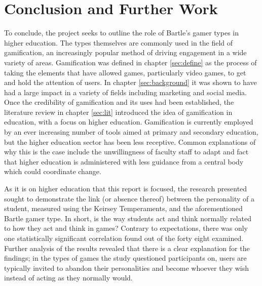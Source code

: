 \documentclass[12pt,a4paper,twoside]{report}
\begin{document}
\chapter{Conclusion and Further Work}
\label{sec:conclusion}
To conclude, the project seeks to outline the role of Bartle's gamer types in higher education. The types themselves are commonly used in the field of gamification, an increasingly popular method of driving engagement in a wide variety of areas. Gamification was defined in chapter \ref{sec:define} as the process of taking the elements that have allowed games, particularly video games, to get and hold the attention of users. In chapter \ref{sec:background} it was shown to have had a large impact in a variety of fields including marketing and social media. Once the credibility of gamification and its uses had been established, the literature review in chapter \ref{sec:lit} introduced the idea of gamification in education, with a focus on higher education. Gamification is currently employed by an ever increasing number of tools aimed at primary and secondary education, but the higher education sector has been less receptive. Common explanations of why this is the case include the unwillingness of faculty staff to adapt and fact that higher education is administered with less guidance from a central body which could coordinate change.

As it is on higher education that this report is focused, the research presented sought to demonstrate the link (or absence thereof) between the personality of a student, measured using the Keirsey Temperaments, and the aforementioned Bartle gamer type. In short, is the way students act and think normally related to how they act and think in games? Contrary to expectations, there was only one statistically significant correlation found out of the forty eight examined. Further analysis of the results revealed that there is a clear explanation for the findings; in the types of games the study questioned participants on, users are typically invited to abandon their personalities and become whoever they wish instead of acting as they normally would.
\end{document}
